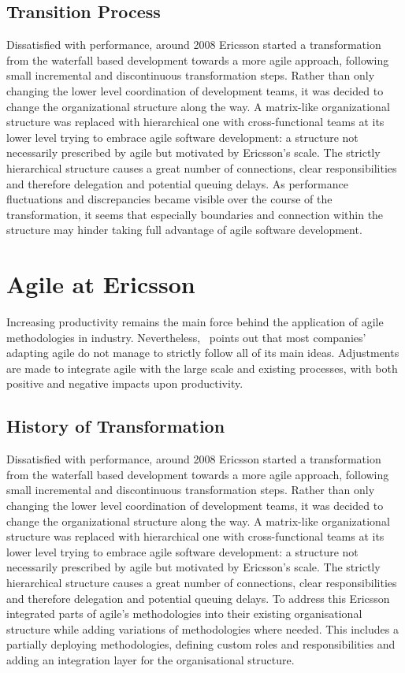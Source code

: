 \subsection{Transition Process}

Dissatisfied with performance, around 2008 Ericsson started a transformation from the waterfall based development towards a more agile approach, following small incremental and discontinuous transformation steps. Rather than only changing the lower level coordination of development teams, it was decided to change the organizational structure along the way. A matrix-like organizational structure was replaced with hierarchical one with cross-functional teams at its lower level trying to embrace agile software development: a structure not necessarily prescribed by agile but motivated by Ericsson's scale.
The strictly hierarchical structure causes a great number of connections, clear responsibilities and therefore delegation and potential queuing delays. As performance fluctuations and discrepancies became visible over the course of the transformation, it seems that especially boundaries and connection within the structure may hinder taking full advantage of agile software development.


\section{Agile at Ericsson}

Increasing productivity remains the main force behind the application of agile methodologies in industry. Nevertheless,~\citet{badampudi2013proddelay} points out that most companies' adapting agile do not manage to strictly follow all of its main ideas. Adjustments are made to integrate agile with the large scale and existing processes, with both positive and negative impacts upon productivity.

\subsection{History of Transformation}

Dissatisfied with performance, around 2008 Ericsson started a transformation from the waterfall based development towards a more agile approach, following small incremental and discontinuous transformation steps. Rather than only changing the lower level coordination of development teams, it was decided to change the organizational structure along the way. A matrix-like organizational structure was replaced with hierarchical one with cross-functional teams at its lower level trying to embrace agile software development: a structure not necessarily prescribed by agile but motivated by Ericsson's scale. The strictly hierarchical structure causes a great number of connections, clear responsibilities and therefore delegation and potential queuing delays. To address this Ericsson integrated parts of agile's methodologies into their existing organisational structure while adding variations of methodologies where needed. This includes a partially deploying methodologies, defining custom roles and responsibilities and adding an integration layer for the organisational structure.

